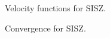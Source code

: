 \documentclass[extra]{gji}
\begin{document}
\begin{figure}
	\caption{
		Velocity functions for SISZ.
		}
\end{figure}

\begin{figure}
	\caption{
		Convergence for SISZ.
		}
\end{figure}
\end{document}
